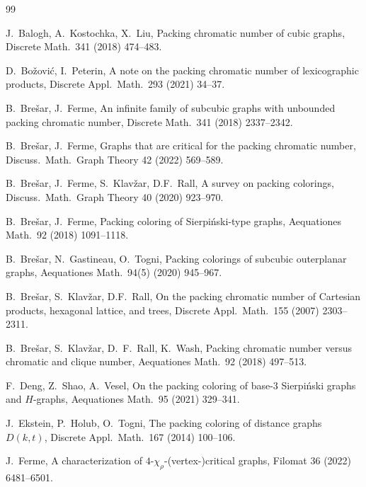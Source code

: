 \documentclass[12pt]{article}
\begin{document}
\baselineskip13pt
\begin{thebibliography}{99}

J.~Balogh, A.~Kostochka, X.~Liu,
Packing chromatic number of cubic graphs,
Discrete Math.\ 341 (2018) 474--483.

D.~Bo\v{z}ovi\'c, I.~Peterin,
A note on the packing chromatic number of lexicographic products,
Discrete Appl.\ Math.\ 293 (2021) 34--37.

B.~Bre\v{s}ar, J.~Ferme,
An infinite family of subcubic graphs with unbounded packing chromatic number,
Discrete Math.\ 341 (2018) 2337--2342.

B.~Bre\v{s}ar, J.~Ferme,
Graphs that are critical for the packing chromatic number,
Discuss.\ Math.\ Graph Theory 42 (2022) 569--589.

B.~Bre\v{s}ar, J.~Ferme, S.~Klav\v{z}ar, D.F.~Rall,
A survey on packing colorings,
Discuss.\ Math.\ Graph Theory 40 (2020) 923--970.

B.~Bre\v{s}ar, J.~Ferme,
Packing coloring of Sierpi\'nski-type graphs,
Aequationes Math.\ 92 (2018) 1091--1118.

B.~Bre\v{s}ar, N.~Gastineau, O.~Togni,
Packing colorings of subcubic outerplanar graphs,
Aequationes Math.\ 94(5) (2020) 945--967.

B.~Bre\v{s}ar, S.~Klav\v{z}ar, D.F.~Rall,
On the packing chromatic number of Cartesian products, hexagonal lattice, and trees,
Discrete Appl.\ Math.\ 155 (2007) 2303--2311.

B.~Bre\v{s}ar, S.~Klav\v{z}ar, D.~F.~Rall, K.~Wash,
Packing chromatic number versus chromatic and clique number,
Aequationes Math.\ 92 (2018) 497--513.

F.~Deng, Z.~Shao, A.~Vesel,
On the packing coloring of base-3 Sierpi\'nski graphs and $H$-graphs,
Aequationes Math.\ 95 (2021) 329--341.


J.~Ekstein, P.~Holub, O.~Togni,
The packing coloring of distance graphs $D(k,t)$,
Discrete Appl.\ Math.\ 167 (2014) 100--106.

J.~Ferme,
A characterization of $4$-$\chi_\rho$-(vertex-)critical graphs,
Filomat 36 (2022) 6481--6501.


\end{thebibliography}
\end{document}
